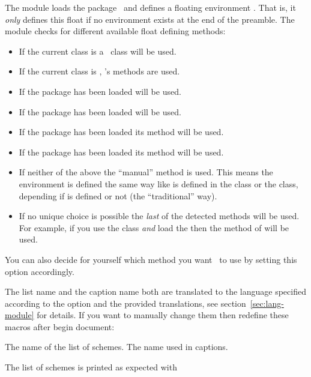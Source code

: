 \documentclass{chemmacros-manual}
\begin{document}
The  module loads the 
package~\cite{pkg:chemnum} and defines a floating environment
.  That is, it \emph{only} defines this float if no
environment  exists at the end of the preamble.  The module checks
for different available float defining methods:
\begin{itemize}
  \item If the current class is a \KOMAScript\ class  will
    be used.
  \item If the current class is , 's methods are used.
  \item If the package  has been loaded  will
    be used.
  \item If the package  has been loaded
     will be used.
  \item {}If the package  has been loaded its
    method will be used.
  \item If the package  has been loaded its method will be used.
  \item If neither of the above the \enquote{manual} method is used.  This
    means the environment is defined the same way like  is
    defined in the  class or the  class, depending if
     is defined or not (the \enquote{traditional} way).
  \item {}If no unique choice is possible the \emph{last} of
    the detected methods will be used.  For example, if you use the
     class \emph{and} load the  then the method of
     will be used.
\end{itemize}

\begin{options}
    You can also decide for yourself which method you want
    \chemmacros\ to use by setting this option accordingly.
\end{options}

The list name and the caption name both are translated to the language
specified according to the  option and the provided translations,
see section~\vref{sec:lang-module} for details. If you want to manually change
them then redefine these macros after begin document:
\begin{commands}
    The name of the list of schemes.
    The name used in captions.
\end{commands}
The list of schemes is printed as expected with
\begin{commands}
\end{commands}
\end{document}

